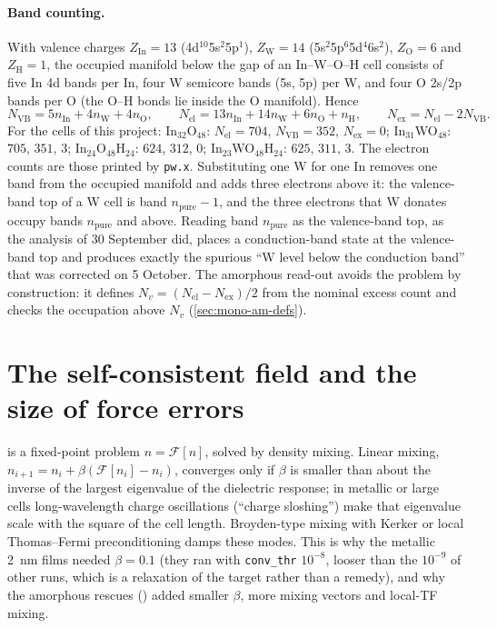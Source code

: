 \paragraph{Band counting.} With valence charges $Z_{\mathrm{In}} = 13$ (4d$^{10}$5s$^2$5p$^1$), $Z_{\mathrm{W}} = 14$
(5s$^2$5p$^6$5d$^4$6s$^2$), $Z_{\mathrm{O}} = 6$ and $Z_{\mathrm{H}} = 1$, the occupied manifold below the gap of an
In--W--O--H cell consists of five In 4d bands per In, four W semicore bands (5s, 5p) per W, and four O 2s/2p bands per
O (the O--H bonds lie inside the O manifold). Hence
\begin{equation}
N_{\mathrm{VB}} = 5n_{\mathrm{In}} + 4n_{\mathrm{W}} + 4n_{\mathrm{O}}, \qquad
N_{\mathrm{el}} = 13n_{\mathrm{In}} + 14n_{\mathrm{W}} + 6n_{\mathrm{O}} + n_{\mathrm{H}},\qquad
N_{\mathrm{ex}} = N_{\mathrm{el}} - 2N_{\mathrm{VB}} .
\label{eq:mono-dft-bands}
\end{equation}
For the cells of this project: In$_{32}$O$_{48}$: $N_{\mathrm{el}} = 704$, $N_{\mathrm{VB}} = 352$, $N_{\mathrm{ex}} = 0$;
In$_{31}$WO$_{48}$: $705$, $351$, $3$; In$_{24}$O$_{48}$H$_{24}$: $624$, $312$, $0$; In$_{23}$WO$_{48}$H$_{24}$: $625$,
$311$, $3$. The electron counts are those printed by \texttt{pw.x}. Substituting one W for one In removes one band from
the occupied manifold and adds three electrons above it: the valence-band top of a W cell is band $n_{\mathrm{pure}}-1$,
and the three electrons that W donates occupy bands $n_{\mathrm{pure}}$ and above. Reading band $n_{\mathrm{pure}}$ as the
valence-band top, as the analysis of 30 September did, places a conduction-band state at the valence-band top and
produces exactly the spurious ``W level below the conduction band'' that was corrected on 5 October. The amorphous
read-out avoids the problem by construction: it defines $N_v = (N_{\mathrm{el}} - N_{\mathrm{ex}})/2$ from the nominal
excess count and checks the occupation above $N_v$ (\cref{sec:mono-am-defs}).

\section{The self-consistent field and the size of force errors}
\label{sec:mono-dft-scf}

 is a fixed-point problem $n = \mathcal{F}[n]$, solved by density mixing. Linear mixing,
$n_{i+1} = n_i + \beta(\mathcal{F}[n_i]-n_i)$, converges only if $\beta$ is smaller than about the inverse of the
largest eigenvalue of the dielectric response; in metallic or large cells long-wavelength charge oscillations
(``charge sloshing'') make that eigenvalue scale with the square of the cell length. Broyden-type mixing
\citep{Johnson1988} with Kerker \citep{Kerker1981} or local Thomas--Fermi preconditioning damps these modes. This is why
the metallic 2~nm films needed $\beta = 0.1$ (they ran with \texttt{conv\_thr} $10^{-8}$, looser than the $10^{-9}$ of
other runs, which is a relaxation of the target rather than a remedy), and why the amorphous rescues
() added smaller $\beta$, more mixing vectors and local-TF mixing.

